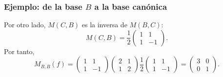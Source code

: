 \begin{frame}[t]
    \frametitle{Ejemplo: de la base $B$ a la base canónica}
    Por otro lado, $M(C,B)$ es la inversa de $M(B,C)$:
        \[
            M(C,B)=\frac12\begin{pmatrix}1&1\\1&-1\end{pmatrix}.
        \]
        Por tanto,
        \[
            M_{B,B}(f)=\begin{pmatrix}1&1\\1&-1\end{pmatrix}
            \begin{pmatrix}2&1\\1&2\end{pmatrix}
            \frac12\begin{pmatrix}1&1\\1&-1\end{pmatrix}
            =\begin{pmatrix}3&0\\0&1\end{pmatrix}.
        \]

\end{frame}

